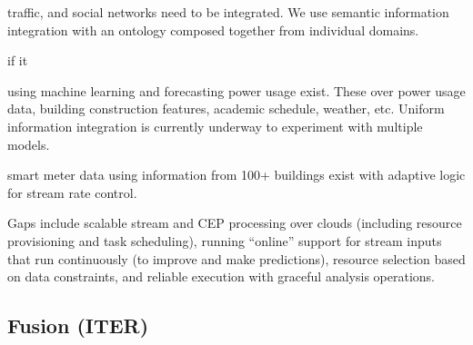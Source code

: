 \documentclass[times]{cpeauth}
\begin{document}


traffic, and social networks need to be integrated. We use semantic %
information integration with an ontology composed together from individual %
domains.

if it %

using machine learning and forecasting power usage exist. These over power %
usage data, building construction features, academic schedule, weather, etc.  %
Uniform information integration is currently underway to experiment with %
multiple models.

smart meter data using information from 100+ buildings exist with adaptive %
logic for stream rate control.

Gaps include scalable stream and CEP processing over clouds (including %
resource provisioning and task scheduling), running ``online'' %
support for stream inputs that run continuously (to improve %
and make predictions), resource selection based on data %
constraints, and reliable execution with graceful %
analysis operations.

\subsection{Fusion (ITER) \label{fusionScott}}

%


\end{document}
